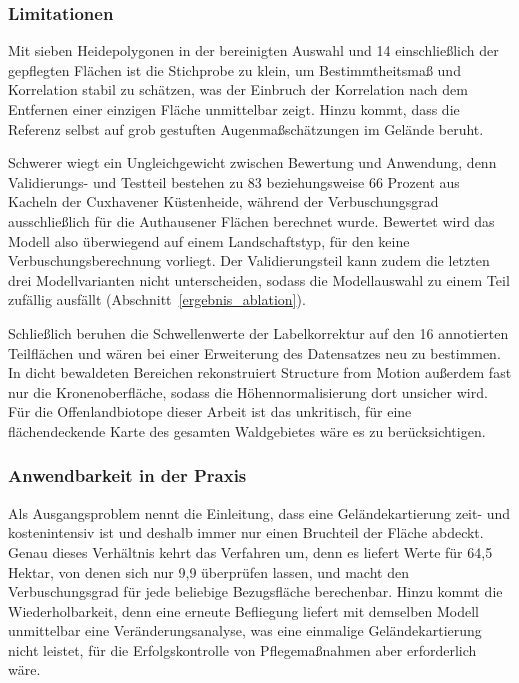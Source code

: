 \subsubsection{Limitationen}

Mit sieben Heidepolygonen in der bereinigten Auswahl und 14 einschließlich der
gepflegten Flächen ist die Stichprobe zu klein, um Bestimmtheitsmaß und
Korrelation stabil zu schätzen, was der Einbruch der Korrelation nach dem
Entfernen einer einzigen Fläche unmittelbar zeigt. Hinzu kommt, dass die
Referenz selbst auf grob gestuften Augenmaßschätzungen im Gelände beruht.

Schwerer wiegt ein Ungleichgewicht zwischen Bewertung und Anwendung, denn
Validierungs- und Testteil bestehen zu 83 beziehungsweise 66 Prozent aus
Kacheln der Cuxhavener Küstenheide, während der Verbuschungsgrad ausschließlich
für die Authausener Flächen berechnet wurde. Bewertet wird das Modell also
überwiegend auf einem Landschaftstyp, für den keine Verbuschungsberechnung
vorliegt. Der Validierungsteil kann zudem die letzten drei Modellvarianten
nicht unterscheiden, sodass die Modellauswahl zu einem Teil zufällig ausfällt
(Abschnitt~\ref{ergebnis_ablation}).

Schließlich beruhen die Schwellenwerte der Labelkorrektur auf den 16
annotierten Teilflächen und wären bei einer Erweiterung des Datensatzes neu zu
bestimmen. In dicht bewaldeten Bereichen rekonstruiert Structure from Motion
außerdem fast nur die Kronenoberfläche, sodass die Höhennormalisierung dort
unsicher wird. Für die Offenlandbiotope dieser Arbeit ist das unkritisch, für
eine flächendeckende Karte des gesamten Waldgebietes wäre es zu
berücksichtigen.

\subsubsection{Anwendbarkeit in der Praxis}

Als Ausgangsproblem nennt die Einleitung, dass eine Geländekartierung zeit- und
kostenintensiv ist und deshalb immer nur einen Bruchteil der Fläche abdeckt.
Genau dieses Verhältnis kehrt das Verfahren um, denn es liefert Werte für 64,5
Hektar, von denen sich nur 9,9 überprüfen lassen, und macht den
Verbuschungsgrad für jede beliebige Bezugsfläche berechenbar. Hinzu kommt die
Wiederholbarkeit, denn eine erneute Befliegung liefert mit demselben Modell
unmittelbar eine Veränderungsanalyse, was eine einmalige Geländekartierung
nicht leistet, für die Erfolgskontrolle von Pflegemaßnahmen aber erforderlich
wäre.

